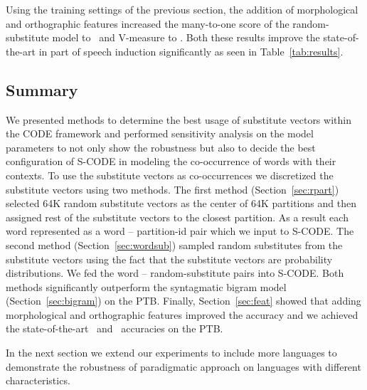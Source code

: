 Using the training settings of the previous section, the addition of
morphological and orthographic features increased the many-to-one
score of the random-substitute model to \ftmto\ and V-measure to
\ftvm.  Both these results improve the state-of-the-art in
part of speech induction significantly as seen in
Table~\ref{tab:results}.

\subsection{Summary}
\label{sec:expsum}

We presented methods to determine the best usage of substitute vectors
within the CODE framework and performed sensitivity analysis on the
model parameters to not only show the robustness but also to decide
the best configuration of S-CODE in modeling the co-occurrence of
words with their contexts.  To use the substitute vectors as
co-occurrences we discretized the substitute vectors using two
methods.  The first method (Section~\ref{sec:rpart}) selected 64K
random substitute vectors as the center of 64K partitions and then
assigned rest of the substitute vectors to the closest partition.  As
a result each word represented as a word -- partition-id pair which we
input to S-CODE. The second method (Section~\ref{sec:wordsub}) sampled
random substitutes from the substitute vectors using the fact that the
substitute vectors are probability distributions.  We fed the word --
random-substitute pairs into S-CODE.  Both methods significantly
outperform the syntagmatic bigram model (Section~\ref{sec:bigram}) on
the PTB.  Finally, Section~\ref{sec:feat} showed that adding
morphological and orthographic features improved the accuracy and we
achieved the state-of-the-art \mto\ and \vm\ accuracies on the PTB.

In the next section we extend our experiments to include more
languages to demonstrate the robustness of paradigmatic approach on
languages with different characteristics.
